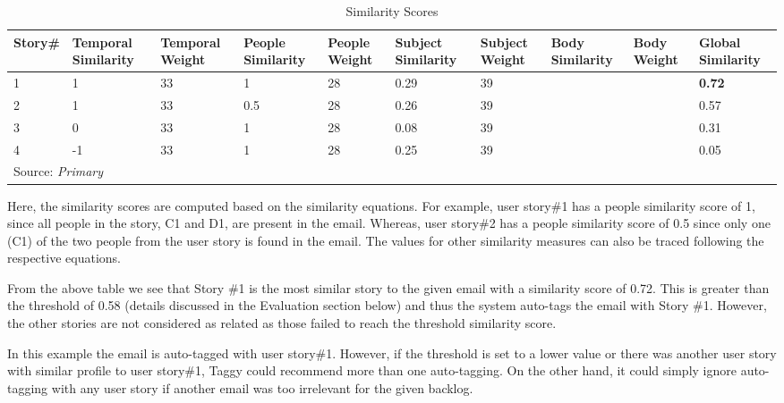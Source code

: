 \begin{table}
  \centering
  \caption{Similarity Scores}
    \begin{tabular}{|p{1.2cm}|p{1.5cm}|p{1.2cm}|p{1.5cm}|p{1.2cm}|p{1.5cm}|p{1.2cm}|p{1.2cm}|p{1.2cm}|p{1.2cm}|}
      	\hline
		\textbf{Story\#} & \textbf{Temporal Similarity} & \textbf{Temporal Weight} & \textbf{People Similarity} & \textbf{People Weight} & \textbf{Subject Similarity} &\textbf{Subject Weight} & \textbf{Body Similarity} &\textbf{Body Weight} &\textbf{Global Similarity}\\
		\hline
		1 & 1 	& 33 & 1 	& 28	& 0.29 & 39	& &	& \textbf{0.72}\\
		2 & 1 	& 33 & 0.5 	& 28 	& 0.26 & 39		& &	& 0.57\\
		3 & 0 	& 33 & 1 	& 28	& 0.08 & 39			& & & 0.31\\
		4 & -1 	& 33 & 1 	& 28	& 0.25 & 39			& & & 0.05\\
		\hline
        \multicolumn{10}{l}{Source: \emph{Primary}}
	\end{tabular}
	\label{tab:similarity}
\end{table}  

Here, the similarity scores are computed based on the similarity equations. For example, user story\#1 has a people similarity score of 1, since all people in the story, C1 and D1, are present in the email. Whereas, user story\#2 has a people similarity score of 0.5 since only one (C1) of the two people from the user story is found in the email. The values for other similarity measures can also be traced following the respective equations.

From the above table we see that Story \#1 is the most similar story to the given email with a similarity score of 0.72. This is greater than the threshold of 0.58 (details discussed in the Evaluation section below) and thus the system auto-tags the email with Story \#1. However, the other stories are not considered as related as those failed to reach the threshold similarity score.

In this example the email is auto-tagged with user story\#1. However, if the threshold is set to a lower value or there was another user story with similar profile to user story\#1, Taggy could recommend more than one auto-tagging. On the other hand, it could simply ignore auto-tagging with any user story if another email was too irrelevant for the given backlog.

